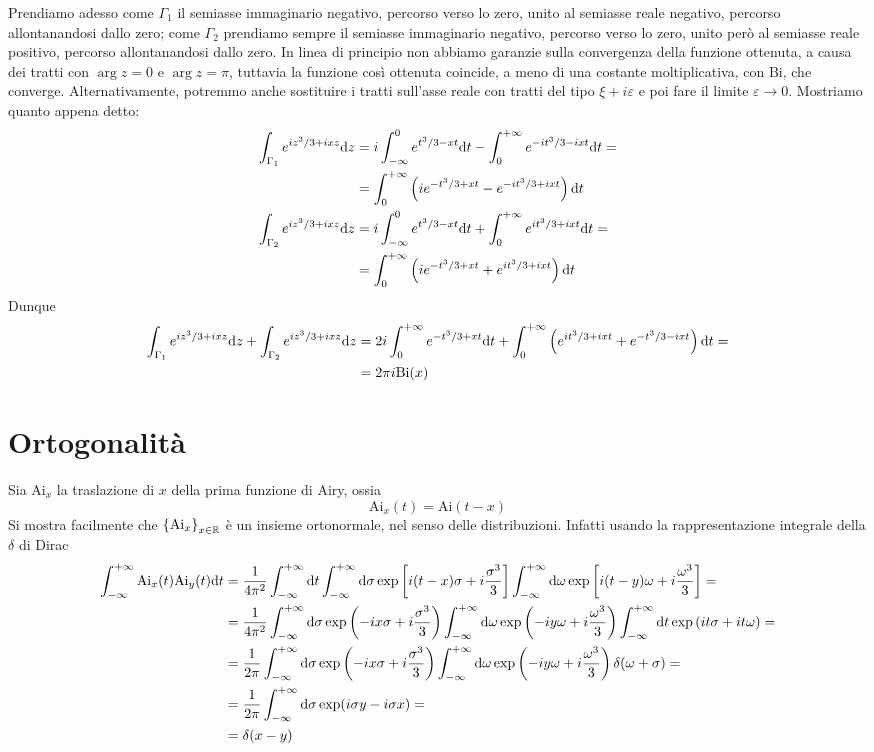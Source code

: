 \documentclass[11 pt]{article}
\newcommand{\ai}{\mathrm{Ai}}
\newcommand{\bi}{\mathrm{Bi}}
\begin{document}
	Prendiamo adesso come $\Gamma_1$ il semiasse immaginario negativo, percorso verso lo zero, unito al semiasse reale negativo, percorso allontanandosi dallo zero; come $\Gamma_2$ prendiamo sempre il semiasse immaginario negativo, percorso verso lo zero, unito però al semiasse reale positivo, percorso allontanandosi dallo zero. In linea di principio non abbiamo garanzie sulla convergenza della funzione ottenuta, a causa dei tratti con $\arg z=0$ e $\arg z=\pi$, tuttavia la funzione così ottenuta coincide, a meno di una costante moltiplicativa, con $\bi$, che converge. Alternativamente, potremmo anche sostituire i tratti sull'asse reale con tratti del tipo $\xi+i\varepsilon$ e poi fare il limite $\varepsilon\to0$. Mostriamo quanto appena detto:
	\begin{align*}
		\int_{\Gamma_1}e^{iz^3/3+ixz}\mathrm{d} z&=i\int_{-\infty}^{0}e^{t^3/3-xt}\mathrm{d} t-\int_{0}^{+\infty}e^{-it^3/3-ixt}\mathrm{d} t=\\&=\int_{0}^{+\infty}\left(ie^{-t^3/3+xt}-e^{-it^3/3+ixt}\right)\mathrm{d} t\\
		\int_{\Gamma_2}e^{iz^3/3+ixz}\mathrm{d} z&=i\int_{-\infty}^{0}e^{t^3/3-xt}\mathrm{d} t+\int_{0}^{+\infty}e^{it^3/3+ixt}\mathrm{d} t=\\&=\int_{0}^{+\infty}\left(ie^{-t^3/3+xt}+e^{it^3/3+ixt}\right)\mathrm{d} t
	\end{align*}
	Dunque
	\begin{align*}		
		\int_{\Gamma_1}e^{iz^3/3+ixz}\d z+\int_{\Gamma_2}e^{iz^3/3+ixz}\d z&=2i\int_{0}^{+\infty}e^{-t^3/3+xt}\d t+\int_{0}^{+\infty}\left(e^{it^3/3+ixt}+e^{-t^3/3-ixt}\right)\d t=\\&=2\pi i\bi(x)
	\end{align*}
	\section{Ortogonalità}
	Sia $\ai_x$ la traslazione di $x$ della prima funzione di Airy, ossia
	\[\ai_x(t)=\ai(t-x)\]
	Si mostra facilmente che $\left\{\ai_x\right\}_{x\in\R}$ è un insieme ortonormale, nel senso delle distribuzioni. Infatti usando la rappresentazione integrale della $\delta$ di Dirac
	\begin{align*}
		\int_{-\infty}^{+\infty}\ai_x(t)\ai_y(t)\d t&=\frac{1}{4\pi ^2}\int_{-\infty}^{+\infty}\d t\int_{-\infty}^{+\infty}\d\sigma\exp\left[i(t-x)\sigma+i\frac{\sigma^3}{3}\right]\int_{-\infty}^{+\infty}\d\omega\exp\left[i(t-y)\omega+i\frac{\omega^3}{3}\right]=\\&=\frac{1}{4\pi^2}\int_{-\infty}^{+\infty}\d\sigma\exp\left(-ix\sigma+i\frac{\sigma^3}{3}\right)\int_{-\infty}^{+\infty}\d\omega\exp\left(-iy\omega+i\frac{\omega^3}{3}\right)\int_{-\infty}^{+\infty}\d t\exp\left(it\sigma+it\omega\right)=\\&=\frac{1}{2\pi}\int_{-\infty}^{+\infty}\d\sigma\exp\left(-ix\sigma+i\frac{\sigma^3}{3}\right)\int_{-\infty}^{+\infty}\d\omega\exp\left(-iy\omega+i\frac{\omega^3}{3}\right)\delta(\omega+\sigma)=\\&=\frac{1}{2\pi}\int_{-\infty}^{+\infty}\d\sigma\exp(i\sigma y-i\sigma x)=\\&=\delta(x-y)
	\end{align*}
\end{document}
